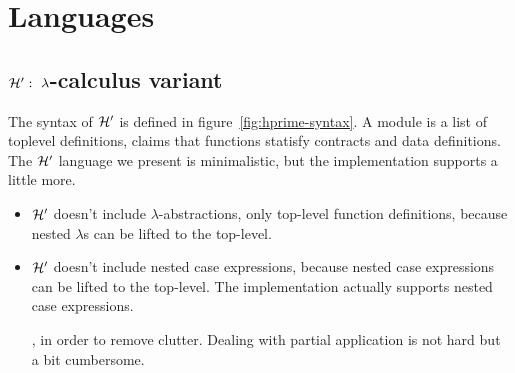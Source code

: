 \documentclass[preprint]{sigplanconf}
\begin{document}
\section{Languages}
\subsection{$\mathcal{H}':~\lambda$-calculus variant}

The syntax of $\mathcal{H}'$ is defined in figure~\ref{fig:hprime-syntax}. A
module is a list of toplevel definitions, claims that functions
statisfy contracts and data definitions.  The $\mathcal{H}'$ language we
present is minimalistic, but the implementation supports a little
more.

\begin{itemize}
\item $\mathcal{H}'$ doesn't include $\lambda$-abstractions, only top-level
  function definitions, because nested $\lambda$s can be lifted to the
  top-level.
\item $\mathcal{H}'$ doesn't include nested case expressions, because
  nested case expressions can be lifted to the top-level.  The
  implementation actually supports nested case expressions.

  , in order to remove clutter. Dealing with
  partial application is not hard but a bit cumbersome.
\end{itemize}
\end{document}
